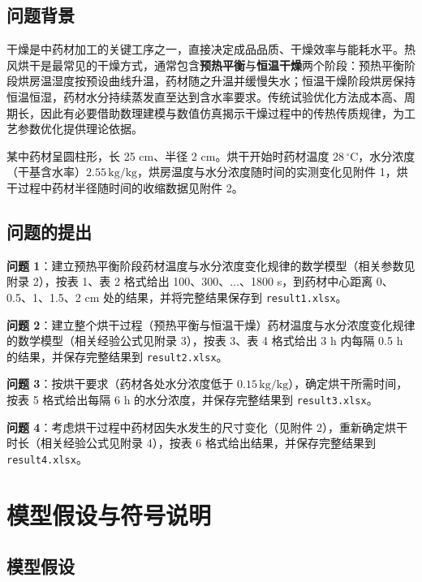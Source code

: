 \documentclass[withoutpreface,bwprint]{cumcmthesis} %
\begin{document}
\subsection{问题背景}

干燥是中药材加工的关键工序之一，直接决定成品品质、干燥效率与能耗水平。热风烘干是最常见的干燥方式，通常包含\textbf{预热平衡}与\textbf{恒温干燥}两个阶段：预热平衡阶段烘房温湿度按预设曲线升温，药材随之升温并缓慢失水；恒温干燥阶段烘房保持恒温恒湿，药材水分持续蒸发直至达到含水率要求。传统试验优化方法成本高、周期长，因此有必要借助数理建模与数值仿真揭示干燥过程中的传热传质规律，为工艺参数优化提供理论依据。

某中药材呈圆柱形，长 25 cm、半径 2 cm。烘干开始时药材温度 $28\,{}^\circ$C，水分浓度（干基含水率）$2.55\,\mathrm{kg/kg}$，烘房温度与水分浓度随时间的实测变化见附件 1，烘干过程中药材半径随时间的收缩数据见附件 2。

\subsection{问题的提出}

\textbf{问题 1}：建立预热平衡阶段药材温度与水分浓度变化规律的数学模型（相关参数见附录 2），按表 1、表 2 格式给出 100、300、$\ldots$、1800 s，到药材中心距离 0、0.5、1、1.5、2 cm 处的结果，并将完整结果保存到 \texttt{result1.xlsx}。

\textbf{问题 2}：建立整个烘干过程（预热平衡与恒温干燥）药材温度与水分浓度变化规律的数学模型（相关经验公式见附录 3），按表 3、表 4 格式给出 3 h 内每隔 0.5 h 的结果，并保存完整结果到 \texttt{result2.xlsx}。

\textbf{问题 3}：按烘干要求（药材各处水分浓度低于 $0.15\,\mathrm{kg/kg}$），确定烘干所需时间，按表 5 格式给出每隔 6 h 的水分浓度，并保存完整结果到 \texttt{result3.xlsx}。

\textbf{问题 4}：考虑烘干过程中药材因失水发生的尺寸变化（见附件 2），重新确定烘干时长（相关经验公式见附录 4），按表 6 格式给出结果，并保存完整结果到 \texttt{result4.xlsx}。

\section{模型假设与符号说明}

\subsection{模型假设}
\end{document}
